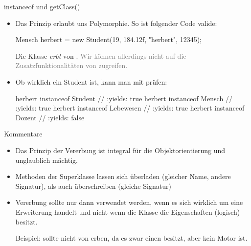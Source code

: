 \begin{frame}[fragile]{instanceof und getClass()}
    \begin{itemize}[<+(1)->]
        \widei
        \item Das Prinzip erlaubt uns Polymorphie.\pause{} So ist folgender Code valide:\pause{}
\begin{plainjava}
Mensch herbert = new Student(19, 184.12f, "herbert", 12345);
\end{plainjava}
        \pause{}Die Klasse  \emph{erbt} von .\pause{} \textcolor{gray}{Wir können allerdings nicht auf die Zusatzfunktionalitäten von  zugreifen.}
        \item Ob  wirklich ein Student ist,\pause{} kann man mit  prüfen:\pause{}
\begin{plainjava}
herbert instanceof Student // :yields: true
herbert instanceof Mensch // :yields: true
herbert instanceof Lebewesen // :yields: true
herbert instanceof Dozent // :yields: false
\end{plainjava}
    \end{itemize}
\end{frame}


\begin{frame}{Kommentare}
    \begin{itemize}[<+(1)->]
        \widei
        \item Das Prinzip der Vererbung ist integral für die Objektorientierung und unglaublich mächtig.
        \item Methoden der Superklasse lassen sich überladen (gleicher Name, andere Signatur),\pause{} als auch überschreiben (gleiche Signatur)
        \item Vererbung sollte nur dann verwendet werden,\pause{} wenn es sich wirklich um eine Erweiterung handelt und nicht wenn die Klasse  die Eigenschaften (logisch) besitzt.\pause{} \medskip\par Beispiel:  sollte nicht von  erben, da es zwar einen besitzt, aber kein Motor ist.
    \end{itemize}
\end{frame}

